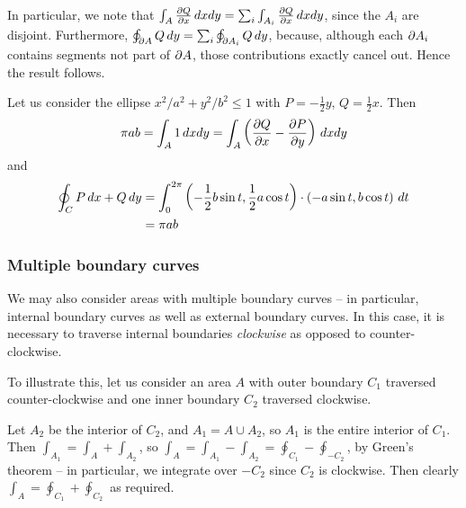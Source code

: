 \documentclass{../../template/note}
\begin{document}
    \begin{remark*}
        In particular, we note that \(\int_A \pd Q x \D x dy = \sum_i \int_{A_i} \pd Q x \D x dy\), since the \(A_i\) are disjoint. Furthermore, \(\oint_{\partial A} Q \,d{y} = \sum_i \oint_{\partial A_i} Q \,d{y}\), because, although each \(\partial A_i\) contains segments not part of \(\partial A\), those contributions exactly cancel out. Hence the result follows.
    \end{remark*}
    
    
    \begin{example*}
        Let us consider the ellipse \(x^2/a^2 + y^2/b^2 \leq 1\) with \(P = -\frac 1 2 y\), \(Q = \frac 1 2 x\). Then
        \begin{align*}
            \pi ab = \int_A 1 \D x dy = \int_A \left(\pd Q x - \pd P y\right) \D x dy
        \end{align*}
        and
        \begin{align*}
            \oint_C P \,d{x} + Q \,d{y} &= \int_0^{2\pi} \left(-\frac 1 2 b \sin t, \frac 1 2 a \cos t\right) \cdot \left(-a \sin t, b \cos t\right) \,d{t} \\
            &= \pi ab
        \end{align*}
    \end{example*}
    
    \subsubsection{Multiple boundary curves}

    We may also consider areas with multiple boundary curves -- in particular, internal boundary curves as well as external boundary curves. In this case, it is necessary to traverse internal boundaries \emph{clockwise} as opposed to counter-clockwise.

    To illustrate this, let us consider an area \(A\) with outer boundary \(C_1\) traversed counter-clockwise and one inner boundary \(C_2\) traversed clockwise.

    Let \(A_2\) be the interior of \(C_2\), and \(A_1 = A \cup A_2\), so \(A_1\) is the entire interior of \(C_1\). Then \(\int_{A_1} = \int_A + \int_{A_2}\), so \(\int_A = \int_{A_1} - \int_{A_2} = \oint_{C_1} - \oint_{-C_2}\), by Green's theorem -- in particular, we integrate over \(-C_2\) since \(C_2\) is clockwise. Then clearly \(\int_A = \oint_{C_1} + \oint_{C_2}\) as required.
    
\end{document}

